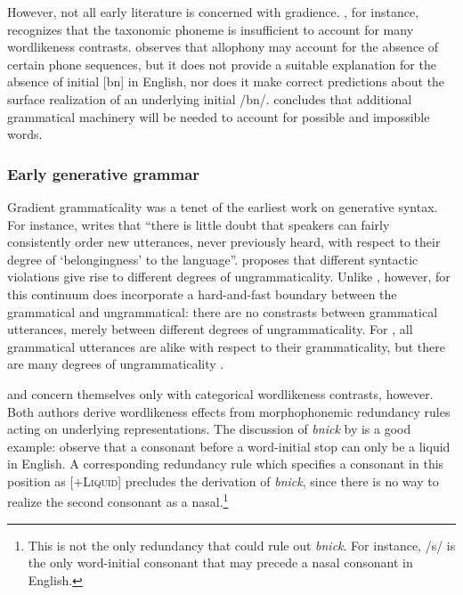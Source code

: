 However, not all early literature is concerned with gradience. \citet[31]{Vogt1954}, for instance, recognizes that the taxonomic phoneme is insufficient to account for many wordlikeness contrasts. \citeauthor{Vogt1954} observes that allophony may account for the absence of certain phone sequences, but it does not provide a suitable explanation for the absence of initial [bn] in English, nor does it make correct predictions about the surface realization of an underlying initial /bn/. \citeauthor{Vogt1954} concludes that additional grammatical machinery will be needed to account for possible and impossible words. 

\subsubsection{Early generative grammar}

Gradient grammaticality was a tenet of the earliest work on generative syntax. For instance, \citet[132]{LSLT} writes that ``there is little doubt that speakers can fairly consistently order new utterances, never previously heard, with respect to their degree of `belongingness' to the language''. \citet{ASPECTS} proposes that different syntactic violations give rise to different degrees of ungrammaticality. Unlike \citeauthor{Fischer-Jorgensen1952}, however, for \citeauthor{LSLT} this continuum does incorporate a hard-and-fast boundary between the grammatical and ungrammatical: there are no constrasts between grammatical utterances, merely between different degrees of ungrammaticality. For \citeauthor{LSLT}, all grammatical utterances are alike with respect to their grammaticality, but there are many degrees of ungrammaticality \citep[61]{Schutze1996}.

\citet{SPR,Halle1962} and \citet{Stanley1967} concern themselves only with categorical wordlikeness contrasts, however. Both authors derive wordlikeness effects from morphophonemic redundancy rules acting on underlying representations. The discussion of \emph{bnick} by \citet[101]{Chomsky1965} is a good example: \citeauthor{Chomsky1965} observe that a consonant before a word-initial stop can only be a liquid in English. A corresponding redundancy rule which specifies a consonant in this position as [$+$\textsc{Liquid}] precludes the derivation of \emph{bnick}, since there is no way to realize the second consonant as a nasal.\footnote{This is not the only redundancy that could rule out \emph{bnick}. For instance, /s/ is the only word-initial consonant that may precede a nasal consonant in English.}

